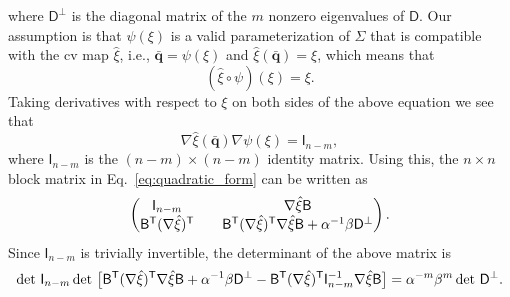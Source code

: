 %
where $\mathsf{D}^\perp$ is the diagonal matrix of the $m$ nonzero eigenvalues of $\mathsf{D}$.
Our assumption is that $\psi(\xi)$ is a valid parameterization of $\Sigma$ that is compatible with the \ac{cv} map $\hat{\xi}$, i.e., $\bar{\bm{q}} = \psi(\xi)$ and $\hat{\xi}(\bar{\bm{q}}) = \xi$, which means that
%
\begin{equation}
  (\hat{\xi}\circ\psi)(\xi) = \xi.
\end{equation}
%
Taking derivatives with respect to $\xi$ on both sides of the above equation we see that
%
\begin{equation}
  \nabla\hat{\xi}(\bar{\bm{q}})\nabla\psi(\xi) = \mathsf{I}_{n-m},
  \label{eq:cv_map_well_behaved}
\end{equation}
%
where $\mathsf{I}_{n-m}$ is the $(n-m)\times(n-m)$ identity matrix.
Using this, the $n\times n$ block matrix in Eq.~\eqref{eq:quadratic_form} can be written as
%
\begin{equation}
  \begin{pmatrix}
    \mathsf{I}_{n-m} &
    \quad\nabla\hat{\xi}\mathsf{B}\\
    \mathsf{B}^\mathsf{T}(\nabla\hat{\xi})^\mathsf{T} &
    \quad\mathsf{B}^\mathsf{T}(\nabla\hat{\xi})^\mathsf{T}\nabla\hat{\xi}\mathsf{B} + \alpha^{-1}\beta\mathsf{D}^\perp
  \end{pmatrix}.
\end{equation}
%
Since $\mathsf{I}_{n-m}$ is trivially invertible, the determinant of the above matrix is
%
\begin{equation}
  \det\,\mathsf{I}_{n-m}\det\,\big[\mathsf{B} \trans(\nabla\hat{\xi})\trans\nabla\hat{\xi}\mathsf{B}  + \alpha^{-1}\beta\mathsf{D}^\perp - \mathsf{B}\trans(\nabla\hat{\xi})\trans\mathsf{I}^{-1}_{n-m}\nabla\hat{\xi}\mathsf{B}\big]
  =
  \alpha^{-m}\beta^m \det\,\mathsf{D}^\perp.
  \label{eq:determinant}
\end{equation}

